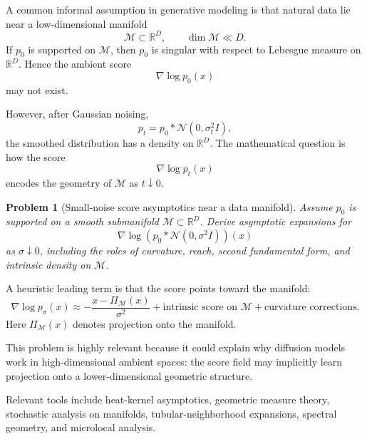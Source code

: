 \documentclass[11pt]{article}
\newtheorem{problem}{Problem}
\begin{document}
A common informal assumption in generative modeling is that natural data lie near a low-dimensional manifold
\begin{equation}
\mathcal{M} \subset \mathbb{R}^D,
\qquad
\dim \mathcal{M} \ll D.
\end{equation}
If $p_0$ is supported on $\mathcal{M}$, then $p_0$ is singular with respect to Lebesgue measure on $\mathbb{R}^D$. Hence the ambient score
\begin{equation}
\nabla \log p_0(x)
\end{equation}
may not exist.

However, after Gaussian noising,
\begin{equation}
p_t = p_0 * \mathcal{N}(0,\sigma_t^2 I),
\end{equation}
the smoothed distribution has a density on $\mathbb{R}^D$. The mathematical question is how the score
\begin{equation}
\nabla \log p_t(x)
\end{equation}
encodes the geometry of $\mathcal{M}$ as $t \downarrow 0$.

\begin{problem}[Small-noise score asymptotics near a data manifold]
Assume $p_0$ is supported on a smooth submanifold $\mathcal{M} \subset \mathbb{R}^D$. Derive asymptotic expansions for
\begin{equation}
\nabla \log (p_0 * \mathcal{N}(0,\sigma^2 I))(x)
\end{equation}
as $\sigma \downarrow 0$, including the roles of curvature, reach, second fundamental form, and intrinsic density on $\mathcal{M}$.
\end{problem}

A heuristic leading term is that the score points toward the manifold:
\begin{equation}
\nabla \log p_\sigma(x)
\approx
-\frac{x-\Pi_{\mathcal{M}}(x)}{\sigma^2}
+
\text{intrinsic score on } \mathcal{M}
+
\text{curvature corrections}.
\end{equation}
Here $\Pi_{\mathcal{M}}(x)$ denotes projection onto the manifold.

This problem is highly relevant because it could explain why diffusion models work in high-dimensional ambient spaces: the score field may implicitly learn projection onto a lower-dimensional geometric structure.

Relevant tools include heat-kernel asymptotics, geometric measure theory, stochastic analysis on manifolds, tubular-neighborhood expansions, spectral geometry, and microlocal analysis.
\end{document}
